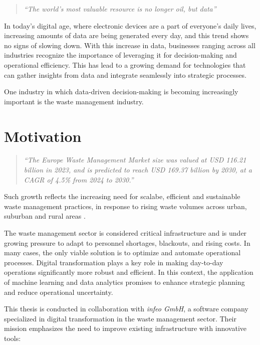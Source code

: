 \documentclass[a4paper,12pt,twoside]{scrreprt}
\begin{document}
\begin{quote}
  \textit{``The world's most valuable resource is no longer oil, but data''}
  \cite{noauthor_worlds_nodate}
\end{quote}
In today's digital age, where electronic devices are a part of everyone's daily
lives, increasing amounts of data
are being generated every day, and this trend shows no signs of slowing down.
\cite{petroc_data_nodate}
With this increase in data, businesses ranging across all industries recognize
the importance of leveraging it for decision-making and operational efficiency.
This has lead to a growing demand for technologies that can gather insights
from
data and integrate seamlessly into strategic processes.

One industry in which data-driven decision-making is becoming increasingly
important is the
waste management industry.

\section{Motivation}
\begin{quote}
  \textit{
    ``The Europe Waste Management Market size was valued at USD 116.21
    billion in
    2023, and is predicted to reach USD 169.37 billion by 2030, at a CAGR of
    4.5\% from 2024 to 2030.''\cite{noauthor_europe_nodate}}
\end{quote}

Such growth reflects the increasing need for scalabe, efficient and sustainable
waste
management practices, in response to rising waste volumes across urban,
suburban and rural areas \cite{noauthor_solid_nodate}.

The waste management sector is considered critical infrastructure and is under
growing pressure to adapt to personnel shortages, blackouts, and rising costs.
In many cases, the only viable solution is to optimize and automate operational
processes. Digital transformation plays a key role in making day-to-day
operations significantly more robust and
efficient.\cite{noauthor_gemeinsam_nodate}
In this context, the application of machine learning and data analytics
promises to enhance strategic planning and reduce operational uncertainty.

This thesis is conducted in collaboration with \textit{infeo GmbH}, a software
company specialized in digital transformation in the waste management
sector. Their mission emphasizes the need to improve existing infrastructure
with innovative tools:
\end{document}
